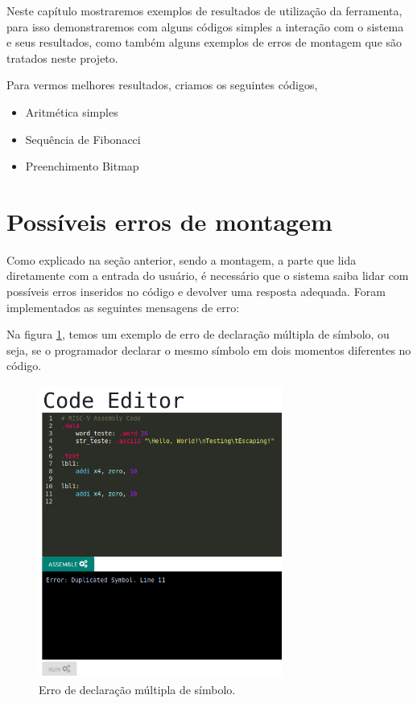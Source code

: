 Neste capítulo mostraremos exemplos de resultados de utilização da ferramenta, para isso demonstraremos com alguns códigos simples a interação com o sistema e seus resultados, como também alguns exemplos de erros de montagem que são tratados neste projeto.

Para vermos melhores resultados, criamos os seguintes códigos,

\begin{itemize}
	\item Aritmética simples
	\item Sequência de Fibonacci
	\item Preenchimento Bitmap 
\end{itemize}


\section{Possíveis erros de montagem}

	Como explicado na seção anterior, sendo a montagem, a parte que lida diretamente com a entrada do usuário, é necessário que o sistema saiba lidar com possíveis erros inseridos no código e devolver uma resposta adequada. Foram implementados as seguintes mensagens de erro:
	
	 Na figura \ref{fig:assemble_error_duplicated_symbol}, temos um exemplo de erro de declaração múltipla de símbolo, ou seja, se o programador declarar o mesmo símbolo em dois momentos diferentes no código.
	
	\begin{figure}[h!]
	  \centering
	  \includegraphics[width=8cm]{img/assemble_error_duplicated_symbol.png}
	  \caption{Erro de declaração múltipla de símbolo.}
	  \label{fig:assemble_error_duplicated_symbol}
	\end{figure}

